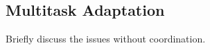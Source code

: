 \subsection{Multitask Adaptation}
\label{sec:multitask-adaptation}

Briefly discuss the issues without coordination.

\newpage

